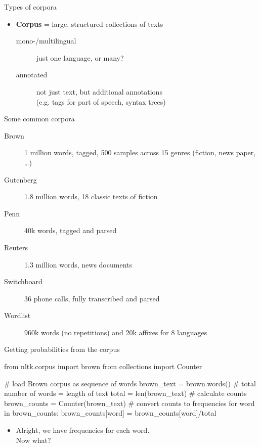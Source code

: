 \documentclass[professionalfonts, xcolor={usenames,svgnames,x11names,table}]{beamer}
\begin{document}
\begin{frame}{Types of corpora}
    \begin{itemize}
        \item \textbf{Corpus} = large, structured collections of texts
        \begin{description}
            \item[mono-\slash multilingual] just one language, or many?
            \item[annotated] not just text, but additional annotations\\
                             (e.g. tags for part of speech, syntax trees)
        \end{description}
    \end{itemize}

    \begin{block}{Some common corpora}
        \begin{description}
            \item[Brown] 1 million words, tagged, 500 samples across 15 genres (fiction, news paper, \ldots)
            \item[Gutenberg] 1.8 million words, 18 classic texts of fiction
            \item[Penn] 40k words, tagged and parsed
            \item[Reuters] 1.3 million words, news documents
            \item[Switchboard] 36 phone calls, fully transcribed and parsed
            \item[Wordlist] 960k words (no repetitions) and 20k affixes for 8 languages
        \end{description}
    \end{block}
\end{frame}

\begin{frame}[fragile]{Getting probabilities from the corpus}
    \begin{pythoncode}
        from nltk.corpus import brown
        from collections import Counter

        # load Brown corpus as sequence of words
        brown_text = brown.words()
        # total number of words = length of text
        total = len(brown_text)
        # calculate counts
        brown_counts = Counter(brown_text)
        # convert counts to frequencies
        for word in brown_counts:
            brown_counts[word] = brown_counts[word]/total
    \end{pythoncode}

    \begin{itemize}
        \item Alright, we have frequencies for each word.\\
              Now what?
    \end{itemize}
\end{frame}
\end{document}
